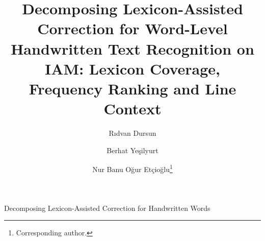 \documentclass{ws-ijprai}
\begin{document}
         {Decomposing Lexicon-Assisted Correction for Handwritten Words}

%
\catchline{}{}{}{}{}
%

\title{Decomposing Lexicon-Assisted Correction for Word-Level\\
Handwritten Text Recognition on IAM: Lexicon Coverage,\\
Frequency Ranking and Line Context}

\author{R\i dvan Dursun}

\address{Department of Software Engineering, Faculty of Computer and
Information Sciences,\\ Sakarya University, 54050 Sakarya, T\"urkiye\\
}

\author{Berhat Ye\c{s}ilyurt}

\address{Department of Software Engineering, Faculty of Computer and
Information Sciences,\\ Sakarya University, 54050 Sakarya, T\"urkiye\\
}

\author{Nur Banu O\u{g}ur Et\c{c}io\u{g}lu\footnote{Corresponding author.}}

\address{Department of Software Engineering, Faculty of Computer and
Information Sciences,\\ Sakarya University, 54050 Sakarya, T\"urkiye\\
}

\maketitle

\begin{history}
\end{history}
\end{document}
